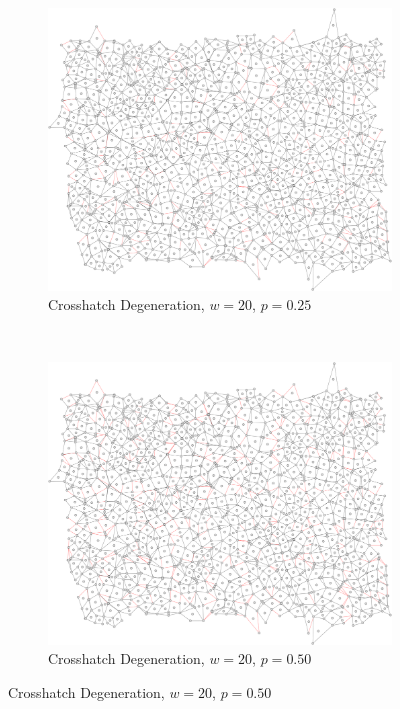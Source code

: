 \documentclass[a4paper,11pt]{report}
\begin{document}
\begin{figure}[htp]
\centering
\begin{subfigure}[t]{0.4\textwidth}
  \includegraphics[width=\textwidth]{ch6_figs/cross_hatch_p25_w20}
  \caption{Crosshatch Degeneration, $w=20$, $p=0.25$}

\end{subfigure}
~
\begin{subfigure}[t]{0.4\textwidth}
  \centering
  \includegraphics[width=\textwidth]{ch6_figs/cross_hatch_p50_w20}
  \caption{Crosshatch Degeneration, $w=20$, $p=0.50$}


\end{subfigure}
\end{figure}
\end{document}

